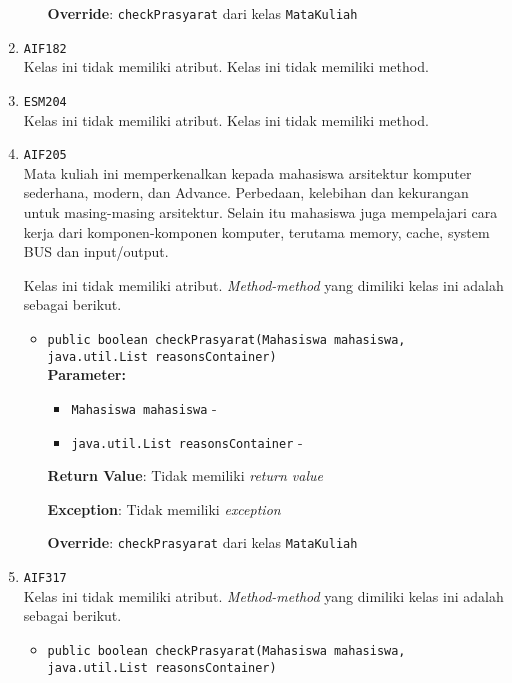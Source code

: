 \documentclass{article}
\begin{document}
\begin{enumerate}
\begin{itemize}
\textbf{Override}: \texttt{checkPrasyarat} dari kelas \texttt{MataKuliah}

\end{itemize}
\item \texttt{AIF182}\\ 


Kelas ini tidak memiliki atribut. Kelas ini tidak memiliki method. \item \texttt{ESM204}\\ 


Kelas ini tidak memiliki atribut. Kelas ini tidak memiliki method. \item \texttt{AIF205}\\ 
Mata kuliah ini memperkenalkan kepada mahasiswa arsitektur komputer 
 sederhana, modern, dan Advance. Perbedaan, kelebihan dan kekurangan untuk 
 masing-masing arsitektur. Selain itu mahasiswa juga mempelajari cara kerja 
 dari komponen-komponen komputer, terutama memory, cache, system BUS dan 
 input/output.

Kelas ini tidak memiliki atribut. \textit{Method-method} yang dimiliki kelas ini adalah sebagai berikut.
\begin{itemize}
\item \texttt{public boolean checkPrasyarat(Mahasiswa mahasiswa, java.util.List reasonsContainer)}\\ 


\textbf{Parameter:}\begin{itemize}
\item \texttt{Mahasiswa mahasiswa} - 
\item \texttt{java.util.List reasonsContainer} - 
\end{itemize}
\textbf{Return Value}: Tidak memiliki \textit{return value}

\textbf{Exception}: Tidak memiliki \textit{exception}

\textbf{Override}: \texttt{checkPrasyarat} dari kelas \texttt{MataKuliah}

\end{itemize}
\item \texttt{AIF317}\\ 


Kelas ini tidak memiliki atribut. \textit{Method-method} yang dimiliki kelas ini adalah sebagai berikut.
\begin{itemize}
\item \texttt{public boolean checkPrasyarat(Mahasiswa mahasiswa, java.util.List reasonsContainer)}\\ 



\end{itemize}
\end{enumerate}
\end{document}
